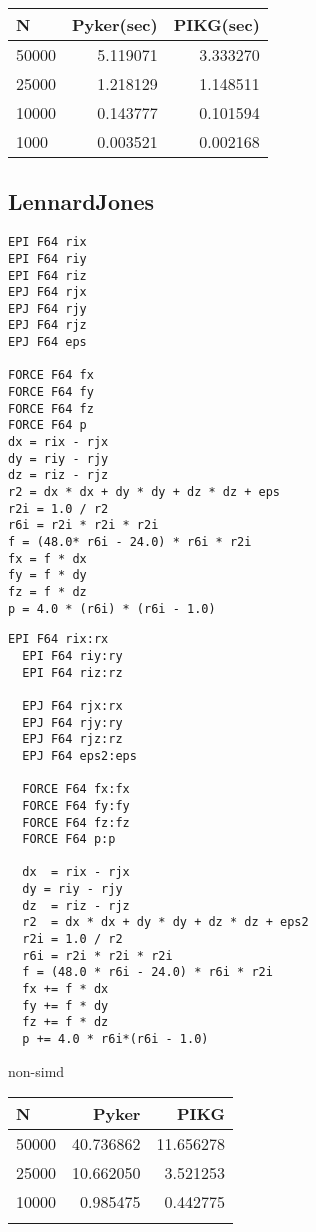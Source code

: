 \documentclass[ams]{article}
\begin{document}
  \begin{tabular}{|l|r|r|} \hline
    N & Pyker(sec) & PIKG(sec) \\ \hline
    50000 & 5.119071 & 3.333270\\
    25000 & 1.218129 & 1.148511 \\
    10000 & 0.143777 & 0.101594 \\
    1000 &  0.003521 & 0.002168 \\ \hline
  \end{tabular}
  

\subsection{LennardJones}

\begin{lstlisting}[frame=single, caption=LennardJones-kernel.pyker, label=LennardJones-kernel.pyker]
EPI F64 rix
EPI F64 riy
EPI F64 riz
EPJ F64 rjx
EPJ F64 rjy
EPJ F64 rjz
EPJ F64 eps

FORCE F64 fx
FORCE F64 fy
FORCE F64 fz
FORCE F64 p
dx = rix - rjx
dy = riy - rjy
dz = riz - rjz
r2 = dx * dx + dy * dy + dz * dz + eps
r2i = 1.0 / r2
r6i = r2i * r2i * r2i
f = (48.0* r6i - 24.0) * r6i * r2i
fx = f * dx
fy = f * dy
fz = f * dz
p = 4.0 * (r6i) * (r6i - 1.0)
\end{lstlisting}
\begin{lstlisting}[frame=single, caption=LennardJones-kernel.pyker, label=LennardJones-kernel.pyker]
  EPI F64 rix:rx
  EPI F64 riy:ry
  EPI F64 riz:rz
  
  EPJ F64 rjx:rx
  EPJ F64 rjy:ry
  EPJ F64 rjz:rz
  EPJ F64 eps2:eps
  
  FORCE F64 fx:fx
  FORCE F64 fy:fy
  FORCE F64 fz:fz
  FORCE F64 p:p
  
  dx  = rix - rjx
  dy = riy - rjy
  dz  = riz - rjz
  r2  = dx * dx + dy * dy + dz * dz + eps2
  r2i = 1.0 / r2
  r6i = r2i * r2i * r2i
  f = (48.0 * r6i - 24.0) * r6i * r2i
  fx += f * dx
  fy += f * dy
  fz += f * dz
  p += 4.0 * r6i*(r6i - 1.0)

\end{lstlisting}


non-simd
\begin{tabular}{|l|r|r|} \hline
  N & Pyker & PIKG \\ \hline
  50000 & 40.736862 & 11.656278 \\
  25000 & 10.662050 & 3.521253 \\
  10000 & 0.985475 & 0.442775 \\
 \\ \hline
\end{tabular}
\end{document}
